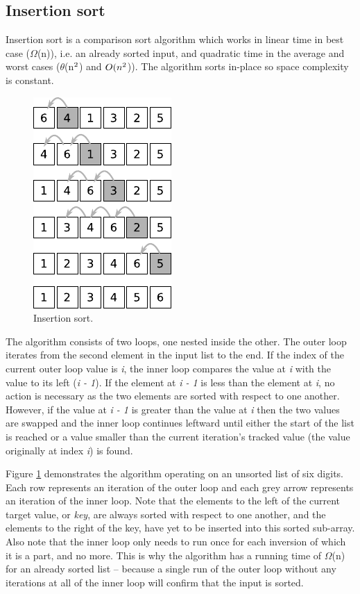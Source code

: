 \documentclass[12pt, a4paper]{article}
\begin{document}
\subsection{Insertion sort}

Insertion sort is a comparison sort algorithm which works in linear time in best case ($\Omega$(n)), i.e. an already sorted input, and quadratic time in the average and worst cases ($\theta$(n$\textsuperscript{2}$) and $O(n\textsuperscript{2}$)). The algorithm sorts in-place so space complexity is constant.

\begin{figure}
    \centering
    \includegraphics{insertion_sort.pdf}
    \caption{\label{fig:insertion_sort}Insertion sort.}
\end{figure}

The algorithm consists of two loops, one nested inside the other. The outer loop iterates from the second element in the input list to the end. If the index of the current outer loop value is \emph{i}, the inner loop compares the value at \emph{i} with the value to its left (\emph{i - 1}). If the element at \emph{i - 1} is less than the element at \emph{i}, no action is necessary as the two elements are sorted with respect to one another. However, if the value at \emph{i - 1} is greater than the value at \emph{i} then the two values are swapped and the inner loop continues leftward until either the start of the list is reached or a value smaller than the current iteration's tracked value (the value originally at index \emph{i}) is found.

Figure \ref{fig:insertion_sort} demonstrates the algorithm operating on an unsorted list of six digits. Each row represents an iteration of the outer loop and each grey arrow represents an iteration of the inner loop. Note that the elements to the left of the current target value, or \emph{key}, are always sorted with respect to one another, and the elements to the right of the key, have yet to be inserted into this sorted sub-array. Also note that the inner loop only needs to run once for each inversion of which it is a part, and no more. This is why the algorithm has a running time of $\Omega$(n) for an already sorted list -- because a single run of the outer loop without any iterations at all of the inner loop will confirm that the input is sorted.
\end{document}

